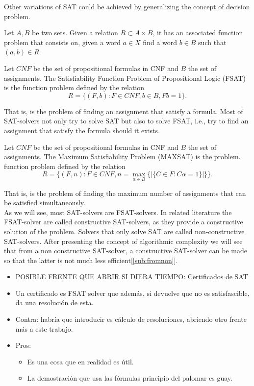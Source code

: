 Other variations of SAT could be achieved by generalizing the concept of decision problem.

\begin{definition}
  Let $A,B$ be two sets. Given a relation $R\subset A\times B$, it has an associated function problem that consists on, given a word $a\in X$ find a word $b\in B$ such that $(a,b)\in R$.
\end{definition}

\begin{definition}
  Let $CNF$ be the set of propositional formulas in CNF and $B$ the set of assignments.  The Satisfiability Function Problem of Propositional Logic (FSAT) is the function problem defined by the relation $$R=\{(F, b): F\in CNF, b \in B, Fb = 1\}.$$
\end{definition}
That is, is the problem of finding an assignment that satisfy a formula. Most of SAT-solvers not only try to solve SAT but also to solve FSAT, i.e., try to find an assignment that satisfy  the formula should it exists.
\begin{definition}
  Let $CNF$ be the set of propositional formulas in CNF and $B$ the set of assignments. The Maximum Satisfiability Problem (MAXSAT) is the problem. function problem defined by the relation $$R=\{(F,n) : F\in CNF, n = \max_{\alpha \in B}\{ | \{C\in F : C\alpha =1 \}| \}\}.$$
\end{definition}

That is, is the problem of finding the maximum number of assignments that can be satisfied simultaneously.\\

As we will see, most SAT-solvers are FSAT-solvers. In related literature the FSAT-solver are called constructive SAT-solvers, as they provide a constructive solution of the problem. Solvers that only solve SAT are called non-constructive SAT-solvers. After presenting the concept of algorithmic complexity we will see that from a non constructive SAT-solver, a constructive SAT-solver can be made so that the latter is not much less efficient[\ref{sub:fromnon}].


\begin{itemize}
\item {\color{red}POSIBLE FRENTE QUE ABRIR SI DIERA TIEMPO: Certificados de SAT}
\item Un certificado es FSAT solver que además, si devuelve que no es satisfascible, da una resolución de esta.
\item Contra: habría que introducir es cálculo de resoluciones, abriendo otro frente más a este trabajo.
\item Pros:
  \begin{itemize}
  \item Es una cosa que en realidad es útil.
  \item La demostración que usa las fórmulas principio del palomar es guay.
  \end{itemize}
\end{itemize}
